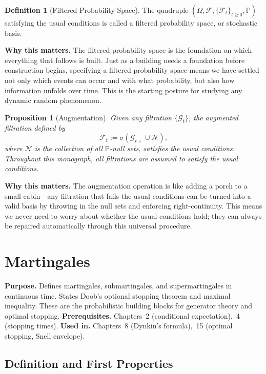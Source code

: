 \documentclass[11pt,a4paper,openany]{book}
\theoremstyle{definition}
\newtheorem{definition}{Definition}[chapter]
\theoremstyle{plain}
\newtheorem{proposition}[theorem]{Proposition}
\theoremstyle{remark}
\newcommand{\1}{\mathbbm{1}}
\newcommand{\F}{\mathcal{F}}
\newcommand{\N}{\mathcal{N}}
\newcommand{\Pbb}{\mathbb{P}}
\newcommand{\calG}{\mathcal{G}}
\begin{document}
\begin{definition}[Filtered Probability Space]
The quadruple $(\Omega, \F, \{\F_{t}\}_{t \geq 0}, \Pbb)$ satisfying the usual conditions is called a filtered probability space, or stochastic basis.
\end{definition}

\medskip
\noindent\textbf{Why this matters.} The filtered probability space is the foundation on which everything that follows is built. Just as a building needs a foundation before construction begins, specifying a filtered probability space means we have settled not only which events can occur and with what probability, but also how information unfolds over time. This is the starting posture for studying any dynamic random phenomenon.

\begin{proposition}[Augmentation]
Given any filtration $\{\calG_{t}\}$, the augmented filtration defined by
\[
\F_{t} := \sigma\left(\calG_{t+} \cup \N\right),
\]
where $\N$ is the collection of all $\Pbb$-null sets, satisfies the usual conditions. Throughout this monograph, all filtrations are assumed to satisfy the usual conditions.
\end{proposition}

\medskip
\noindent\textbf{Why this matters.} The augmentation operation is like adding a porch to a small cabin---any filtration that fails the usual conditions can be turned into a valid basis by throwing in the null sets and enforcing right-continuity. This means we never need to worry about whether the usual conditions hold; they can always be repaired automatically through this universal procedure.

\chapter{Martingales}

\noindent\textbf{Purpose.} Defines martingales, submartingales, and supermartingales in continuous time. States Doob's optional stopping theorem and maximal inequality. These are the probabilistic building blocks for generator theory and optimal stopping.
\textbf{Prerequisites.} Chapters~2 (conditional expectation),~4 (stopping times).
\textbf{Used in.} Chapters~8 (Dynkin's formula),~15 (optimal stopping, Snell envelope).

\section{Definition and First Properties}
\end{document}
